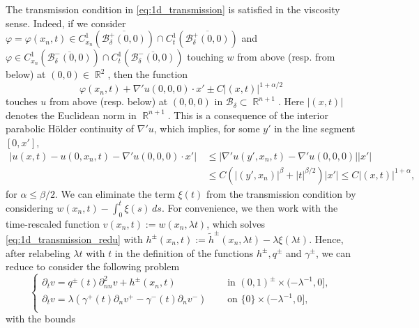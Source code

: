 \documentclass[12pt]{article}
\makeatletter
\newenvironment{customproof}[1]{%
  \par\pushQED{\qed}%
  \normalfont\topsep6pt \trivlist
  \item[\hskip\labelsep\itshape
    Proof of #1\@addpunct{.}]\ignorespaces
}{%
  \popQED\endtrivlist\@endpefalse
}
\numberwithin{Theorem}{section}
\theoremstyle{definition}
\theoremstyle{remark}
\numberwithin{equation}{section}
\DeclareMathOperator{\R}{\mathbb{R}}
\newcommand{\p}{\partial}
\makeatother
\begin{document}
\begin{customproof}{Theorem \ref{Thm:C1gamma}}
The transmission condition in \eqref{eq:1d_transmission} is satisfied in the viscosity sense. 
Indeed, if we consider $\varphi=\varphi(x_n,t) \in C_{x_n}^{1}(\overline{ \mathcal{B}_\delta^+(0,0)}) \cap  C_t^{1}(\overline{ \mathcal{B}_\delta^+(0,0)})$ and $\varphi \in C_{x_n}^{1}(\overline{ \mathcal{B}_\delta^-(0,0)}) \cap  C_t^{1}(\overline{ \mathcal{B}_\delta^-(0,0)})$  touching $w$ from above (resp. from below) at $(0,0) \in \R^2$, then the function
    \[
\varphi(x_n,t)+ \nabla' u(0,0,0) \cdot x' \pm C|(x,t)|^{1+\alpha/2}
    \]
touches $u$ from above (resp. below) at $(0,0,0)$ in $ \mathcal{B}_{\delta} \subset \R^{n+1}$. Here $|(x,t)|$ denotes the Euclidean norm in $\R^{n+1}$.
This is a consequence of the interior parabolic H\"older continuity of $\nabla' u$, which implies, for some $y'$ in the line segment $[0,x']$,
\begin{equation}\label{eq:est_on_x_prime}
\begin{aligned}
     \left| u(x,t) - u(0,x_n,t)-\nabla'u(0,0,0)\cdot x'\right| \,&\leq \left| \nabla' u(y',x_n,t) -\nabla'u(0,0,0) \right||x' | \\
    &\leq C\left(|(y',x_n)|^{\beta} +|t|^{\beta/2}\right)|x'|
    \leq C|(x,t)|^{1+\alpha},
\end{aligned}
\end{equation}
for $\alpha\leq \beta/2$.
We can eliminate the term $\xi(t)$ from the transmission condition by considering $w(x_n,t) - \int_{0}^t \xi(s) \, ds$. For convenience, we then work with the time-rescaled function $v(x_n,t) := w(x_n, \lambda t)$, which solves \eqref{eq:1d_transmission_redu} with $h^\pm(x_n,t) := \tilde{h}^\pm(x_n, \lambda t) - \lambda \xi(\lambda t)$.
  Hence, after relabeling $\lambda t$ with $t$ in the definition of the functions $h^{\pm},q^{\pm}$ and $\gamma^\pm$, we can reduce to consider the following problem   
\begin{equation} \label{eq:1d_transmission_redu}
    \begin{cases}
        \p_t v = q^{\pm}(t) \p_{nn}^2 v + h^{\pm}(x_n,t) \quad &\text{ in } (0,1)^{\pm} \times (-\lambda^{-1},0] , \\
        \p_t v= \lambda \left( \gamma^{+}( t) \p_n v^+ - \gamma^{-}( t) \p_n v^- \right)  \quad &\text{ on } \{ 0 \} \times  (-\lambda^{-1},0] , \\
    \end{cases}
\end{equation}
with the bounds
\begin{equation} \label{eq_bounds_on_h}
        \begin{aligned}

\end{aligned}
\end{equation}
\end{customproof}
\end{document}
